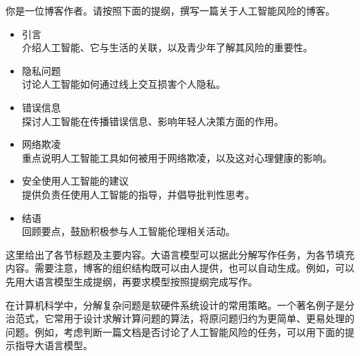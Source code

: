 \vspace{0.5em}
\begin{tcolorbox}

\begingroup
\setlength{\leftskip}{2em}
\setlength{\rightskip}{2em}

你是一位博客作者。请按照下面的提纲，撰写一篇关于人工智能风险的博客。

\vspace{0.5em}

\begin{itemize}
\item 引言\\
介绍人工智能、它与生活的关联，以及青少年了解其风险的重要性。
\item 隐私问题\\
讨论人工智能如何通过线上交互损害个人隐私。
\item 错误信息\\
探讨人工智能在传播错误信息、影响年轻人决策方面的作用。
\item 网络欺凌\\
重点说明人工智能工具如何被用于网络欺凌，以及这对心理健康的影响。
\item 安全使用人工智能的建议\\
提供负责任使用人工智能的指导，并倡导批判性思考。
\item 结语\\
回顾要点，鼓励积极参与人工智能伦理相关活动。
\end{itemize}

\vspace{0.5em}

\underline{\hspace{2em}}

\endgroup

\end{tcolorbox}
\vspace{0.5em}

\noindent 这里给出了各节标题及主要内容。大语言模型可以据此分解写作任务，为各节填充内容。需要注意，博客的组织结构既可以由人提供，也可以自动生成。例如，可以先用大语言模型生成提纲，再要求模型按照提纲完成写作。

在计算机科学中，分解复杂问题是软硬件系统设计的常用策略。一个著名例子是分治范式，它常用于设计求解计算问题的算法，将原问题归约为更简单、更易处理的问题。例如，考虑判断一篇文档是否讨论了人工智能风险的任务，可以用下面的提示指导大语言模型。

